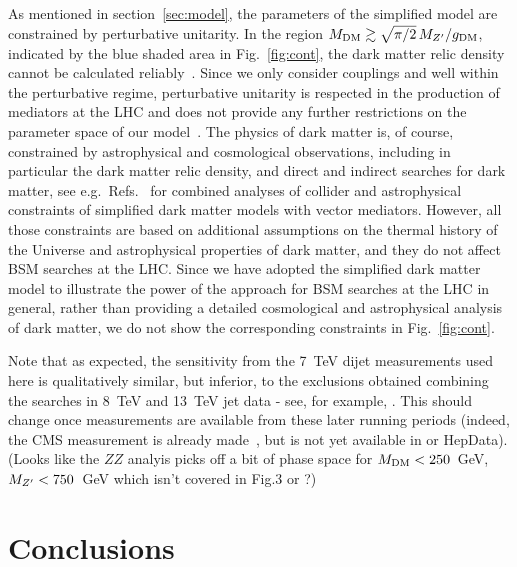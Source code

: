 \documentclass[floatfix]{article}
\begin{document}
As mentioned in section~\ref{sec:model},  the parameters of the simplified model are constrained by perturbative unitarity. 
In the region $M_{\rm DM} \gtrsim \sqrt{\pi/2}\, M_{Z^{\prime}}/g_{\rm DM}$, indicated by the blue shaded area in Fig.~\ref{fig:cont}, 
the dark matter relic density cannot be calculated reliably~\cite{Kahlhoefer:2015bea}. Since we only consider couplings \GDM and \GQ well within the perturbative regime, perturbative unitarity is respected in the production of mediators at the LHC 
and does not provide any further restrictions on the parameter space of our model~\cite{Englert:2016joy}. The physics of dark matter is, of course, constrained by astrophysical and cosmological observations, including in particular the dark matter relic density, and direct and indirect searches for dark matter, see e.g.\ Refs.~\cite{Kahlhoefer:2015bea, Heisig:2015ira,Jacques:2016dqz} for combined analyses of collider and astrophysical constraints of simplified dark matter models with vector mediators. However, all those constraints are based on additional assumptions on the thermal history of the Universe and astrophysical properties of dark matter, and they do not affect BSM searches at the LHC. Since we have adopted the simplified dark matter model to illustrate the power of the \Contur approach for BSM searches at the LHC in general, rather than providing a detailed cosmological and astrophysical analysis of dark matter, we do not show the corresponding constraints in Fig.~\ref{fig:cont}. 



Note that as expected, the sensitivity from the 7~TeV dijet measurements used here is qualitatively similar, but inferior, to the exclusions obtained 
combining the searches in 8~TeV and 13~TeV jet data - see, for example, \cite{Fairbairn:2016iuf}. This should change once measurements
are available from these later running periods (indeed, the CMS measurement is already made~\cite{Khachatryan:2016wdh}, but is not yet available in \rivet or HepData).
(Looks like the $ZZ$ analyis picks off a bit of phase space for $M_{\rm DM} < 250$~GeV, $M_{Z^{\prime}} < 750$~GeV which isn't covered in Fig.3 or \cite{Fairbairn:2016iuf}?)


\section{Conclusions}\label{sec:conclusions}
\end{document}
